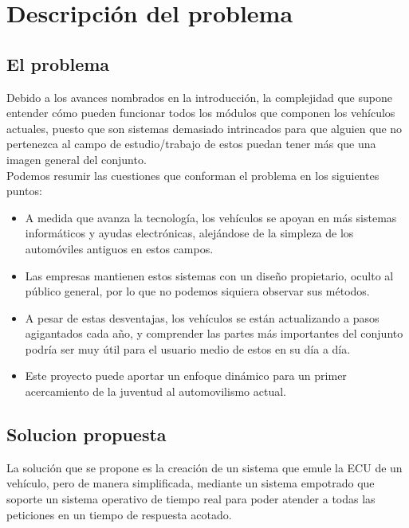 \chapter{Descripción del problema}
\section{El problema}

Debido a los avances nombrados en la introducción, la complejidad que supone entender cómo pueden funcionar todos los módulos que componen los vehículos actuales, puesto que son sistemas demasiado intrincados para que alguien que no pertenezca al campo de estudio/trabajo de estos puedan tener más que una imagen general del conjunto. \\

Podemos resumir las cuestiones que conforman el problema en los siguientes puntos:

\begin{itemize}
    \item A medida que avanza la tecnología, los vehículos se apoyan en más sistemas informáticos y ayudas electrónicas, alejándose de la simpleza de los automóviles antiguos en estos campos.

    \item Las empresas mantienen estos sistemas con un diseño propietario, oculto al público general, por lo que no podemos siquiera observar sus métodos.

    \item A pesar de estas desventajas, los vehículos se están actualizando a pasos agigantados cada año, y comprender las partes más importantes del conjunto podría ser muy útil para el usuario medio de estos en su día a día.

    \item Este proyecto puede aportar un enfoque dinámico para un primer acercamiento de la juventud al automovilismo actual.
\end{itemize}


\section{Solucion propuesta}

La solución que se propone es la creación de un sistema que emule la ECU de un vehículo, pero de manera simplificada, mediante un sistema empotrado que soporte un sistema operativo de tiempo real para poder atender a todas las peticiones en un tiempo de respuesta acotado. 

